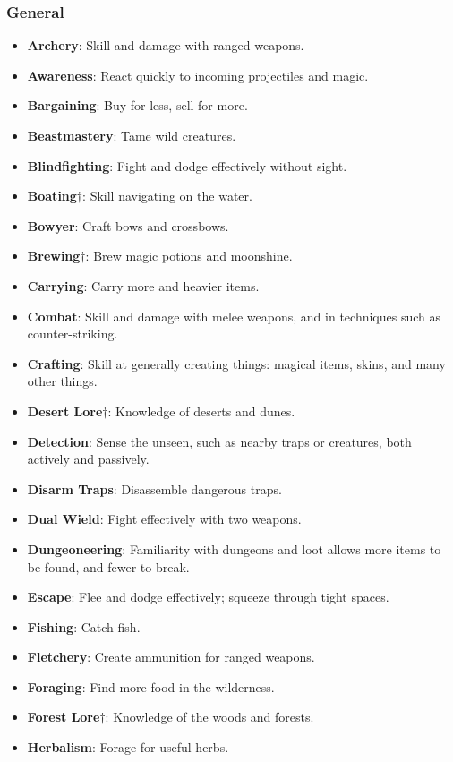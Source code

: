 \subsubsection{General}
\begin{itemize}
\item {\bf Archery}: Skill and damage with ranged weapons.
\item {\bf Awareness}: React quickly to incoming projectiles and magic.
\item {\bf Bargaining}: Buy for less, sell for more.
\item {\bf Beastmastery}: Tame wild creatures.
\item {\bf Blindfighting}: Fight and dodge effectively without sight. 
\item {\bf Boating}$\dagger$: Skill navigating on the water.
\item {\bf Bowyer}: Craft bows and crossbows.
\item {\bf Brewing}$\dagger$: Brew magic potions and moonshine. 
\item {\bf Carrying}: Carry more and heavier items.
\item {\bf Combat}: Skill and damage with melee weapons, and in techniques such as counter-striking.
\item {\bf Crafting}: Skill at generally creating things: magical items, skins, and many other things.
\item {\bf Desert Lore}$\dagger$: Knowledge of deserts and dunes. 
\item {\bf Detection}: Sense the unseen, such as nearby traps or creatures, both actively and passively.
\item {\bf Disarm Traps}: Disassemble dangerous traps. 
\item {\bf Dual Wield}: Fight effectively with two weapons. 
\item {\bf Dungeoneering}: Familiarity with dungeons and loot allows more items to be found, and fewer to break.
\item {\bf Escape}: Flee and dodge effectively; squeeze through tight spaces.
\item {\bf Fishing}: Catch fish.
\item {\bf Fletchery}: Create ammunition for ranged weapons.
\item {\bf Foraging}: Find more food in the wilderness.
\item {\bf Forest Lore}$\dagger$: Knowledge of the woods and forests. 
\item {\bf Herbalism}: Forage for useful herbs. 

\end{itemize}

